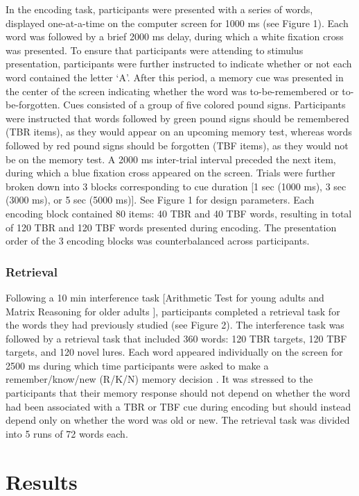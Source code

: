 \documentclass[man]{apa6}
\begin{document}
In the encoding task, participants were presented with a series of words, displayed one-at-a-time on the computer screen for 1000 ms (see Figure 1). Each word was followed by a brief 2000 ms delay, during which a white fixation cross was presented. To ensure that participants were attending to stimulus presentation, participants were further instructed to indicate whether or not each word contained the letter ‘A’. After this period, a memory cue was presented in the center of the screen indicating whether the word was to-be-remembered or to-be-forgotten. Cues consisted of a group of five colored pound signs. Participants were instructed that words followed by green pound signs should be remembered (TBR items), as they would appear on an upcoming memory test, whereas words followed by red pound signs should be forgotten (TBF items), as they would not be on the memory test. A 2000 ms inter-trial interval preceded the next item, during which a blue fixation cross appeared on the screen. Trials were further broken down into 3 blocks corresponding to cue duration [1 sec (1000 ms), 3 sec (3000 ms), or 5 sec (5000 ms)]. See Figure 1 for design parameters. Each encoding block contained 80 items: 40 TBR and 40 TBF words, resulting in total of 120 TBR and 120 TBF words presented during encoding. The presentation order of the 3 encoding blocks was counterbalanced across participants.

\subsubsection*{Retrieval}

Following a 10 min interference task [Arithmetic Test for young adults and Matrix Reasoning for older adults \parencite{wais2008}], participants completed a retrieval task for the words they had previously studied (see Figure 2). The interference task was followed by a retrieval task that included 360 words: 120 TBR targets, 120 TBF targets, and 120 novel lures. Each word appeared individually on the screen for 2500 ms during which time participants were asked to make a remember/know/new (R/K/N) memory decision \parencite[see][for a review]{yonelinas.jacoby1995remknow}. It was stressed to the participants that their memory response should not depend on whether the word had been associated with a TBR or TBF cue during encoding but should instead depend only on whether the word was old or new. The retrieval task was divided into 5 runs of 72 words each.

\section*{Results}
\end{document}
